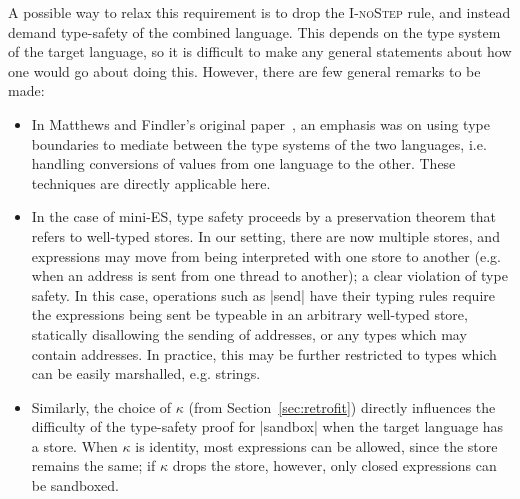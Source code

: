 A possible way to relax this requirement is to drop the \textsc{I-noStep}
rule, and instead demand type-safety of the combined language.  This
depends on the type system of the target language, so it is difficult to
make any general statements about how one would go about doing this.  However,
there are few general remarks to be made:

\begin{itemize}
    \item In Matthews and Findler's original
        paper~\cite{Matthews:2007:OSM:1190216.1190220}, an emphasis was
        on using type boundaries to mediate between the type systems of
        the two languages, i.e. handling conversions of values from
        one language to the other.  These techniques are directly applicable here.

    \item In the case of mini-ES, type safety proceeds by a preservation theorem
        that refers to well-typed stores.  In our setting, there are now multiple
        stores, and expressions may move from being interpreted with one store
        to another (e.g. when an address is sent from one thread to
        another); a clear violation of type safety.  In this case, operations
        such as |send| have their typing rules require
        the expressions being sent be typeable in an arbitrary well-typed store,
        statically disallowing the sending of addresses, or any types which
        may contain addresses.  In practice, this may be further restricted to
        types which can be easily marshalled, e.g. strings.

    \item Similarly, the choice of $\kappa$ (from Section~\ref{sec:retrofit}) directly
        influences the difficulty of the type-safety proof for
        |sandbox| when the target language has a store.  When
        $\kappa$ is identity, most expressions can be allowed, since the store
        remains the same; if $\kappa$ drops the store, however, only closed expressions
        can be sandboxed.
\end{itemize}

